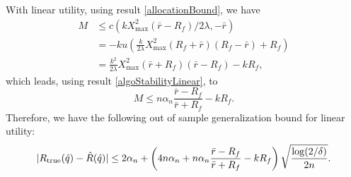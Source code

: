 With linear utility, using result \eqref{allocationBound}, we have
\begin{align*}
  M &\leq c(k X^2_{\max}(\bar r - R_f)/2\lambda, -\bar r)\\
    &=-k u\left(\frac{k}{2\lambda} X^2_{\max}(R_f+\bar r)(R_f-\bar r) + R_f\right)\\
    &=\frac{k^2}{2\lambda} X^2_{\max}(\bar r + R_f)(\bar r - R_f) - k R_f,
\end{align*}
which leads, using result \eqref{algoStabilityLinear}, to
\begin{equation*}
  M \leq n\alpha_n \frac{\bar r - R_f}{\bar r + R_f} - kR_f.
\end{equation*}
Therefore, we have the following out of sample generalization bound for linear utility:
\begin{equation}
  \label{boundWithK}
  |R_{\mathrm{true}}(\hat{q}) - \hat{R}(\hat{q})| \leq 
  2\alpha_n + \left(4n\alpha_n + n\alpha_n\frac{\bar r - R_f}{\bar r +
      R_f} - kR_f\right)
  \sqrt{\frac{\log(2/\delta)}{2n}}.
\end{equation}


